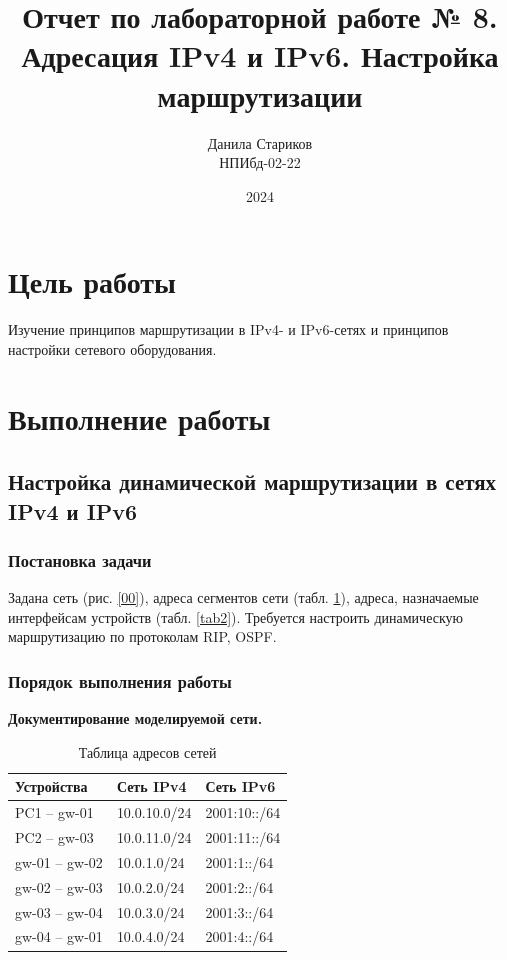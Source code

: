 

\title{Отчет по лабораторной работе № 8. \\ Адресация IPv4 и IPv6. Настройка маршрутизации}
\author{Данила Стариков \\ НПИбд-02-22}
\date{2024}



\maketitle
\newpage
\tableofcontents

\newpage
\section{Цель работы}
Изучение принципов маршрутизации в IPv4- и IPv6-сетях и принципов настройки сетевого оборудования.

\newpage
\section{Выполнение работы}
\subsection{Настройка динамической маршрутизации в сетях IPv4 и IPv6}
\subsubsection{Постановка задачи}
Задана сеть (рис. \ref{00}), адреса сегментов сети (табл. \ref{tab1}), адреса, назначаемые интерфейсам устройств (табл. \ref{tab2}). Требуется настроить динамическую маршрутизацию по протоколам RIP, OSPF.

\subsubsection{Порядок выполнения работы}
\textbf{Документирование моделируемой сети.}
  \begin{table}[]
    \centering
    \caption{Таблица адресов сетей}
    \label{tab1}
    \begin{tabular}{|l|l|l|}
      \hline
      Устройства    & Сеть IPv4    & Сеть IPv6    \\ \hline
      PC1 – gw-01   & 10.0.10.0/24 & 2001:10::/64 \\ \hline
      PC2 – gw-03   & 10.0.11.0/24 & 2001:11::/64 \\ \hline
      gw-01 – gw-02 & 10.0.1.0/24  & 2001:1::/64  \\ \hline
      gw-02 – gw-03 & 10.0.2.0/24  & 2001:2::/64  \\ \hline
      gw-03 – gw-04 & 10.0.3.0/24  & 2001:3::/64  \\ \hline
      gw-04 – gw-01 & 10.0.4.0/24  & 2001:4::/64  \\ \hline
    \end{tabular}
  \end{table}

